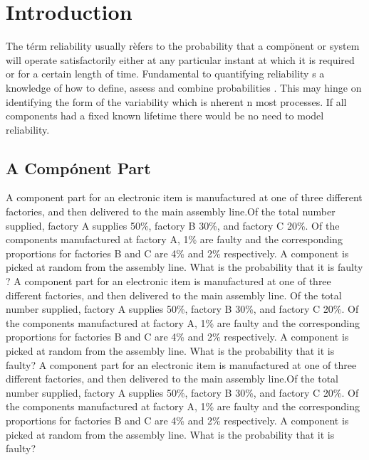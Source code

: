 \section{Introduction}\label{intro}
The t\'erm reliability usually r\`efers to the probability that a
comp\"onent or system will operate satisfactorily either at any particular
instant at which it is required or for a certain length of
time. Fundamental to quantifying reliability s a knowledge of how to
define, assess and combine probabilities \cite{Bontempi2005Adaptive}. This may hinge on identifying the
form of the variability which is nherent n most processes. If all
components had a fixed known lifetime there would be no need to model
reliability.


\subsection{A Comp\'onent Part}
A component part for an electronic item is
manufactured at one of three different factories, and then delivered to
the main assembly line.Of the total number supplied, factory A supplies
50\%, factory B 30\%, and factory C 20\%. Of the components
manufactured at factory A, 1\% are faulty and the corresponding
proportions for factories B and C are 4\% and 2\% respectively. A
component is picked at random from the assembly line. What is the
probability that it is faulty \cite{ilyas2004hsn}? 
A component part for an electronic item is
manufactured at one of three different factories, and then delivered to
the main assembly line. Of the total number supplied, factory A supplies
50\%, factory B 30\%, and factory C 20\%. Of the components
manufactured at factory A, 1\% are faulty and the corresponding
proportions for factories B and C are 4\% and 2\% respectively. A
component is picked at random from the assembly line. What is the
probability that it is faulty? 
A component part for an electronic item is
manufactured at one of three different factories, and then delivered to
the main assembly line.Of the total number supplied, factory A supplies
50\%, factory B 30\%, and factory C 20\%. Of the components
manufactured at factory A, 1\% are faulty and the corresponding
proportions for factories B and C are 4\% and 2\% respectively. A
component is picked at random from the assembly line. What is the
probability that it is faulty? 

